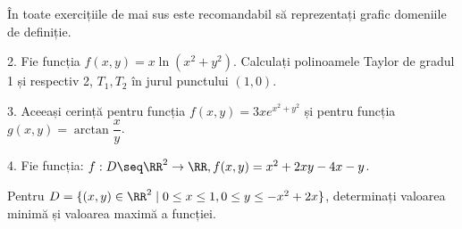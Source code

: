 În toate exercițiile de mai sus este recomandabil să reprezentați
grafic domeniile de definiție.

\vspace{1cm}

2. Fie funcția $ f(x,y) = x \ln(x^2 + y^2) $. Calculați polinoamele Taylor
de gradul 1 și respectiv 2, $ T_1, T_2 $ în jurul punctului $ (1, 0) $.

\vspace{1cm}

3. Aceeași cerință pentru funcția $ f(x, y) = 3xe^{x^2 + y^2} $ și pentru
funcția $ g(x, y) = \arctan \dfrac{x}{y} $.

\vspace{1cm}

4. Fie funcția: $ f : D \seq \RR^2 \to \RR, f(x, y) = x^2 + 2xy - 4x - y $.

Pentru $ D = \{ (x, y) \in \RR^2 \mid 0 \leq x \leq 1, 0 \leq y \leq -x^2 + 2x \} $,
determinați valoarea minimă și valoarea maximă a funcției.


